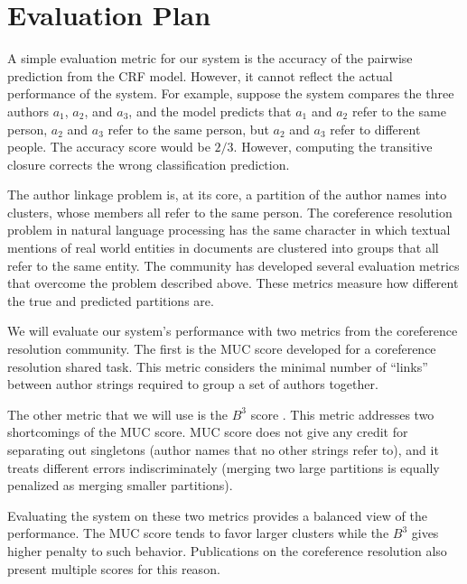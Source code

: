 \documentclass[twocolumn,letterpaper]{article}
\begin{document}
\section{Evaluation Plan} %
\label{sec:evaluation}
A simple evaluation metric for our system is the accuracy
of the pairwise prediction from the CRF model.  However, it cannot
reflect the actual performance of the system.  For example, suppose
the system compares the three authors $a_1$, $a_2$, and $a_3$, and the
model predicts that $a_1$ and $a_2$ refer to the same person, $a_2$
and $a_3$ refer to the same person, but $a_2$ and $a_3$ refer to
different people.  The accuracy score would be $2/3$.  However,
computing the transitive closure corrects the wrong classification
prediction.

The author linkage problem is, at its core, a partition of the author
names into clusters, whose members all refer to the same person.  The
coreference resolution problem in natural language processing has the
same character in which textual mentions of real world entities in
documents are clustered into groups that all refer to the same entity.
The community has developed several evaluation metrics that overcome
the problem described above.  These metrics measure how different the
true and predicted partitions are.

We will evaluate our system's performance with two metrics from the
coreference resolution community.  The first is the MUC score
\cite{Vilain95} developed for a coreference resolution shared task.
This metric considers the minimal number of ``links'' between author
strings required to group a set of authors together.

The other metric that we will use is the $B^3$ score \cite{Bagga98b}.
This metric addresses two shortcomings of the MUC score.  MUC score
does not give any credit for separating out singletons (author names
that no other strings refer to), and it treats different errors
indiscriminately (merging two large partitions is equally penalized as
merging smaller partitions).

Evaluating the system on these two metrics provides a balanced view of
the performance.  The MUC score tends to favor larger clusters while
the $B^3$ gives higher penalty to such behavior.  Publications on the
coreference resolution also present multiple scores for this reason.



\end{document}

